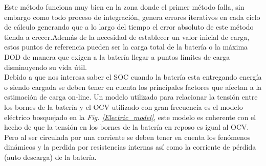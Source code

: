 \documentclass[10pt,a4paper]{article}
\begin{document}
 Este método funciona muy bien en la zona donde el primer método falla, sin embargo como todo proceso de integración, genera errores iterativos en cada ciclo de cálculo generando que a lo largo del tiempo el error absoluto de este método tienda a crecer.Además de la necesidad de establecer un valor inicial de carga, estos puntos de referencia pueden ser la carga total de la batería o la máxima DOD de manera que exigen a la batería llegar a puntos límites de carga disminuyendo su vida útil.\\

Debido a que nos interesa saber el SOC cuando la batería esta entregando energía o siendo cargada se deben tener en cuenta los principales factores que afectan a la estimación de carga on-line. Un modelo utilizado para relacionar la tensión entre los bornes de la batería y el OCV utilizado con gran frecuencia es el modelo eléctrico bosquejado en la \emph{Fig. \ref{Electric_model}}, este modelo es coherente con el hecho de que la tensión en los bornes de la batería en reposo es igual al OCV. Pero al ser circulada por una corriente se deben tener en cuenta los fenómenos dinámicos  y la perdida por resistencias internas así como la corriente de pérdida (auto descarga) de la batería.
  
\end{document}
